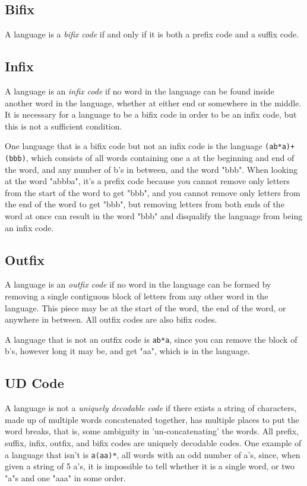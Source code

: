 \documentclass{article}
\begin{document}
\subsection{Bifix}
A language is a \textit{bifix code} if and only if it is both a prefix code and a suffix code. 

\subsection{Infix}
A language is an \textit{infix code} if no word in the language can be found inside another word in the language, whether at either end or somewhere in the middle. It is necessary for a language to be a bifix code in order to be an infix code, but this is not a sufficient condition. 

\par One language that is a bifix code but not an infix code is the language \verb-(ab*a)+(bbb)-, which consists of all words containing one a at the beginning and end of the word, and any number of b's in between, and the word "bbb". 
When looking at the word "abbba", it's a prefix code because you cannot remove only letters from the start of the word to get "bbb", and you cannot remove only letters from the end of the word to get "bbb", but removing letters from both ends of the word at once can result in the word "bbb" and disqualify the language from being an infix code. 

\subsection{Outfix}
A language is an \textit{outfix code} if no word in the language can be formed by removing a single contiguous block of letters from any other word in the language. This piece may be at the start of the word, the end of the word, or anywhere in between. All outfix codes are also bifix codes. 
\par A language that is not an outfix code is \verb-ab*a-, since you can remove the block of b's, however long it may be, and get "aa", which is in the language. 

\subsection{UD Code}
A language is not a \textit{uniquely decodable code} if there exists a string of characters, made up of multiple words concatenated together, has multiple places to put the word breaks, that is, some ambiguity in 'un-concatenating' the words. All prefix, suffix, infix, outfix, and bifix codes are uniquely decodable codes. One example of a language that isn't is \verb-a(aa)*-, all words with an odd number of a's, since, when given a string of 5 a's, it is impossible to tell whether it is a single word, or two "a"s and one "aaa" in some order. 
\end{document}
